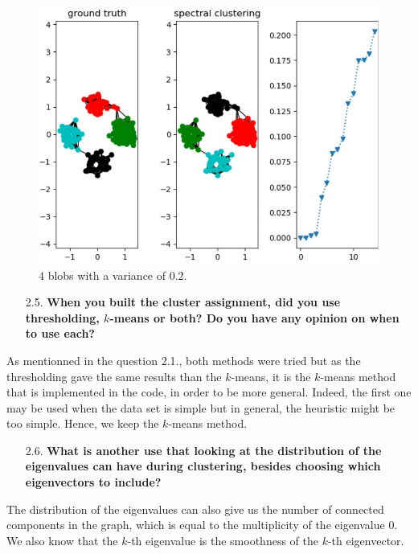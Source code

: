 \documentclass[a4paper, 11pt]{report}
\begin{document}
    \begin{figure}[!h]
        \centering
        \includegraphics[scale=0.6]{images/question_24_results.jpg}
        \caption{$4$ blobs with a variance of $0.2$.}
        \label{fig:question-24-results}
    \end{figure}

\begin{itemize}
    \item[2.5.] \textbf{When you built the cluster assignment, did you use thresholding, $k$-means or both? Do you have any opinion on when to use each?}
\end{itemize}

    As mentionned in the question 2.1., both methods were tried but as the thresholding gave the same results than the $k$-means, it is the $k$-means method that is implemented in the code, in order to be more general. Indeed, the first one may be used when the data set is simple but in general, the heuristic might be too simple. Hence, we keep the $k$-means method.

\begin{itemize}
    \item[2.6.] \textbf{What is another use that looking at the distribution of the eigenvalues can have during clustering, besides choosing which eigenvectors to include?}
\end{itemize}

    The distribution of the eigenvalues can also give us the number of connected components in the graph, which is equal to the multiplicity of the eigenvalue $0$. We also know that the $k$-th eigenvalue is the smoothness of the $k$-th eigenvector.
\end{document}
